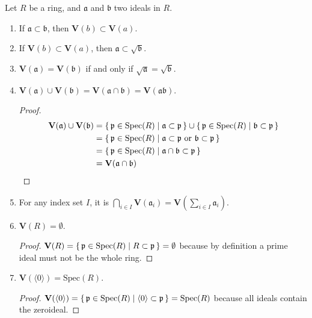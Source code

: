 \begin{prps}
    Let \(R\) be a ring, and \(\mathfrak{a}\) and \(\mathfrak{b}\) two ideals in \(R\).
    \begin{enumerate}
        \item If \(\mathfrak{a} \subset \mathfrak{b}\), then \(\mathbf{V}(b) \subset \mathbf{V}(a)\).
        \item If \(\mathbf{V}(b) \subset \mathbf{V}(a)\), then \(\mathfrak{a} \subset \sqrt{\mathfrak{b}}\).
        \item \(\mathbf{V}(\mathfrak{a}) = \mathbf{V}(\mathfrak{b})\) if and only if \(\sqrt{\mathfrak{a}} = \sqrt{\mathfrak{b}}\).
        \item \(\mathbf{V}(\mathfrak{a}) \cup \mathbf{V}(\mathfrak{b}) = \mathbf{V}(\mathfrak{a} \cap \mathfrak{b}) = \mathbf{V}(\mathfrak{a}\mathfrak{b})\).
        \begin{proof}
            \begin{align}
                \mathbf{V}(\mathfrak{a}) \cup \mathbf{V}(\mathfrak{b}) &= \left\{\, \mathfrak{p} \in \mathrm{Spec}(R) \mathrel{\mid} \mathfrak{a} \subset \mathfrak{p} \,\right\} \cup \left\{\, \mathfrak{p} \in \mathrm{Spec}(R) \mathrel{\mid} \mathfrak{b} \subset \mathfrak{p} \,\right\} \\
                &= \left\{\, \mathfrak{p} \in \mathrm{Spec}(R) \mathrel{\mid} \mathfrak{a} \subset \mathfrak{p} \text{ or } \mathfrak{b} \subset \mathfrak{p} \,\right\} \\
                &= \left\{\, \mathfrak{p} \in \mathrm{Spec}(R) \mathrel{\mid} \mathfrak{a} \cap \mathfrak{b} \subset \mathfrak{p} \,\right\} \\
                &= \mathbf{V}(\mathfrak{a} \cap \mathfrak{b})
            \end{align}
        \end{proof}
        \item For any index set \(I\), it is \(\bigcap_{i \in I}\mathbf{V}(\mathfrak{a}_i) = \mathbf{V}(\sum_{i \in I}\mathfrak{a}_i)\).
        \item \(\mathbf{V}(R) = \emptyset\).
        \begin{proof}
            \(\mathbf{V}(R) = \left\{\, \mathfrak{p} \in \mathrm{Spec}(R) \mathrel{\mid} R \subset \mathfrak{p} \,\right\} = \emptyset\) because by definition a prime ideal must not be the whole ring.
        \end{proof}
        \item \(\mathbf{V}(\langle 0 \rangle) = \mathrm{Spec}(R)\).
        \begin{proof}
            \(\mathbf{V}(\langle 0 \rangle) = \left\{\, \mathfrak{p} \in \mathrm{Spec}(R) \mathrel{\mid} \langle 0 \rangle \subset \mathfrak{p} \,\right\} = \mathrm{Spec}(R)\) because all ideals contain the zeroideal.
        \end{proof}
    \end{enumerate}
\end{prps}


